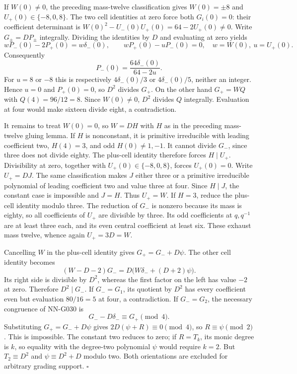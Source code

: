 If $W(0)\ne0$, the preceding mass-twelve classification gives
$W(0)=\pm8$ and $U_+(0)\in\{-8,0,8\}$.
The two cell identities at zero force both $G_i(0)=0$:
their coefficient determinant is
$W(0)^2-U_-(0)U_+(0)=64-2U_+(0)\ne0$.
Write $G_\pm=DP_\pm$ integrally. Dividing the identities by
$D$ and evaluating at zero yields
\[
 wP_-(0)-2P_+(0)=w\delta_-(0),\qquad
 wP_+(0)-uP_-(0)=0,
 \quad w=W(0),\ u=U_+(0).
\]
Consequently
\[
 P_-(0)=\frac{64\delta_-(0)}{64-2u}.
\]
For $u=8$ or $-8$ this is respectively
$4\delta_-(0)/3$ or $4\delta_-(0)/5$, neither an integer.
Hence $u=0$ and $P_+(0)=0$, so $D^2$ divides $G_+$.
On the other hand $G_+=WQ$ with $Q(4)=96/12=8$.
Since $W(0)\ne0$, $D^2$ divides $Q$ integrally.
Evaluation at four would make sixteen divide eight, a contradiction.

It remains to treat $W(0)=0$, so $W=DH$ with $H$ as in
the preceding mass-twelve gluing lemma. If $H$ is nonconstant,
it is primitive irreducible with leading coefficient two,
$H(4)=3$, and odd $H(0)\ne1,-1$.
It cannot divide $G_-$, since three does not divide eighty.
The plus-cell identity therefore forces $H\mid U_+$.
Divisibility at zero, together with $U_+(0)\in\{-8,0,8\}$,
forces $U_+(0)=0$. Write $U_+=DJ$.
The same classification makes $J$ either three or a primitive
irreducible polynomial of leading coefficient two and value three
at four. Since $H\mid J$, the constant case is impossible and
$J=H$. Thus $U_+=W$.
If $H=3$, reduce the plus-cell identity modulo three.
The reduction of $G_-$ is nonzero because its mass is eighty,
so all coefficients of $U_+$ are divisible by three.
Its odd coefficients at $q,q^{-1}$ are at least three each,
and its even central coefficient at least six. These exhaust
mass twelve, whence again $U_+=3D=W$.

Cancelling $W$ in the plus-cell identity gives
$G_+=G_-+D\psi$. The other cell identity becomes
\[
 (W-D-2)G_-=D\bigl(W\delta_-+(D+2)\psi\bigr).
\]
Its right side is divisible by $D^2$, whereas the first factor
on the left has value $-2$ at zero. Therefore $D^2\mid G_-$.
If $G_-=G_1$, its quotient by $D^2$ has every coefficient even
but evaluation $80/16=5$ at four, a contradiction.
If $G_-=G_2$, the necessary congruence of NN-G030 is
\[
 G_--D\delta_-\equiv G_+\pmod4.
\]
Substituting $G_+=G_-+D\psi$ gives
$2D(\psi+R)\equiv0\pmod4$, so $R\equiv\psi\pmod2$.
This is impossible. The constant two reduces to zero; if
$R=T_k$, its monic degree is $k$, so equality with the degree-two
polynomial $\psi$ would require $k=2$. But
$T_2\equiv D^2$ and $\psi\equiv D^2+D$ modulo two.
Both orientations are excluded for arbitrary grading support.
\hfill$\square$

